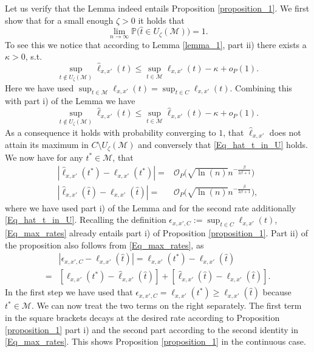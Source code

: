 \documentclass[conference]{IEEEtran}
\begin{document}
Let us verify that the Lemma indeed entails Proposition \ref{proposition_1}. We first show that for a small enough $\zeta>0$ it holds that
\begin{equation} \label{Eq_hat_t_in_U}
\lim_{n \to \infty} \mathbb{P}\Big( \hat t \in U_{\zeta}(\mathcal{M})\Big) =1.
\end{equation}
To see this we notice that according to Lemma \ref{lemma_1}, part ii) there exists a $\kappa>0$, s.t.
$$
 \sup_{t \not \in  U_\zeta(\mathcal{M})} \hat \ell_{x,x'}(t) \le  \sup_{t \in \mathcal{M}}\ell_{x,x'}(t) -\kappa +o_P(1).
$$
Here we have used $  \sup_{t \in \mathcal{M}}\ell_{x,x'}(t)=  \sup_{t \in C}\ell_{x,x'}(t)$. Combining this with part i) of the Lemma we have
$$
 \sup_{t \not \in  U_\zeta(\mathcal{M})} \hat \ell_{x,x'}(t) \le  \sup_{t \in \mathcal{M}} \hat \ell_{x,x'}(t) -\kappa +o_P(1).
$$
As a consequence it holds with probability converging to $1$, that $\hat \ell_{x,x'}$ does not attain its maximum in $C \setminus U_\zeta (\mathcal{M})$ and conversely that \eqref{Eq_hat_t_in_U} holds. We now have for any $t^* \in \mathcal{M}$, that
\begin{align} \label{Eq_max_rates}
     |\hat \ell_{x,x'}(t^*)- \ell_{x,x'}(t^*)|= &\mathcal{O}_P \Big( \sqrt{\ln(n)} n^{-\frac{\beta}{2\beta+1}}\Big)\\
      |\hat \ell_{x,x'}(\hat t)- \ell_{x,x'}(\hat t)|  = & \mathcal{O}_P \Big( \sqrt{\ln(n)} n^{-\frac{\beta}{2\beta+1}}\Big), \nonumber
\end{align}
where we have used part i) of the Lemma and for the second rate additionally \eqref{Eq_hat_t_in_U}. Recalling the definition $\epsilon_{x,x',C} := \sup_{t \in C} \ell_{x,x'}(t) $, \eqref{Eq_max_rates} already entails part i) of Proposition \ref{proposition_1}. Part ii) of the proposition also follows from \eqref{Eq_max_rates}, as 
\begin{align*}
 &  |\epsilon_{x,x',C}-\ell_{x,x'}(\hat t)| = \ell_{x,x'}( t^*)-\ell_{x,x'}(\hat t)\\
  = &  [\ell_{x,x'}( t^*)-\hat \ell_{x,x'}(\hat t)]+[\hat\ell_{x,x'}(\hat t) -\ell_{x,x'}(\hat t)].
\end{align*}
In the first step we have used that $\epsilon_{x,x',C} =\ell_{x,x'}( t^*) \ge \ell_{x,x'}(\hat t)$ because $t^* \in \mathcal{M}$. We can now treat the two terms on the right separately. The first term in the square brackets decays at the desired rate according to Proposition \ref{proposition_1} part i) and the second part according to the second identity in \eqref{Eq_max_rates}. This shows Proposition \ref{proposition_1} in the continuous case. \\
\end{document}
